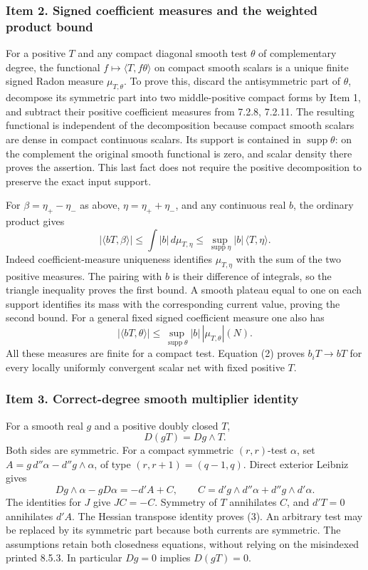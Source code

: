 \documentclass[11pt]{article}
\begin{document}
\subsubsection{Item 2. Signed coefficient measures and the weighted product bound}

For a positive \(T\) and any compact diagonal smooth test \(\theta\) of complementary degree, the functional \(f\mapsto\langle T,f\theta\rangle\) on compact smooth scalars is a unique finite signed Radon measure \(\mu_{T,\theta}\). To prove this, discard the antisymmetric part of \(\theta\), decompose its symmetric part into two middle-positive compact forms by Item 1, and subtract their positive coefficient measures from 7.2.8, 7.2.11. The resulting functional is independent of the decomposition because compact smooth scalars are dense in compact continuous scalars. Its support is contained in \(\operatorname{supp}\theta\): on the complement the original smooth functional is zero, and scalar density there proves the assertion. This last fact does not require the positive decomposition to preserve the exact input support.

For \(\beta=\eta_+-\eta_-\) as above, \(\eta=\eta_++\eta_-\), and any continuous real \(b\), the ordinary product gives
\[
 |\langle bT,\beta\rangle|
 \leq\int |b|\,d\mu_{T,\eta}
 \leq\sup_{\operatorname{supp}\eta}|b|\,\langle T,\eta\rangle.
 \tag{1}
\]
Indeed coefficient-measure uniqueness identifies \(\mu_{T,\eta}\) with the sum of the two positive measures. The pairing with \(b\) is their difference of integrals, so the triangle inequality proves the first bound. A smooth plateau equal to one on each support identifies its mass with the corresponding current value, proving the second bound. For a general fixed signed coefficient measure one also has
\[
 |\langle bT,\theta\rangle|\leq
 \sup_{\operatorname{supp}\theta}|b|\,|\mu_{T,\theta}|(N).
 \tag{2}
\]
All these measures are finite for a compact test. Equation (2) proves \(b_iT\to bT\) for every locally uniformly convergent scalar net with fixed positive \(T\).

\subsubsection{Item 3. Correct-degree smooth multiplier identity}

For a smooth real \(g\) and a positive doubly closed \(T\),
\[
 D(gT)=Dg\wedge T.\tag{3}
\]
Both sides are symmetric. For a compact symmetric \((r,r)\)-test \(\alpha\), set \(A=g\,d''\alpha-d''g\wedge\alpha\), of type \((r,r+1)=(q-1,q)\). Direct exterior Leibniz gives
\[
 Dg\wedge\alpha-gD\alpha
 =-d'A+C,\qquad
 C=d'g\wedge d''\alpha+d''g\wedge d'\alpha.
\]
The identities for \(J\) give \(JC=-C\). Symmetry of \(T\) annihilates \(C\), and \(d'T=0\) annihilates \(d'A\). The Hessian transpose identity proves (3). An arbitrary test may be replaced by its symmetric part because both currents are symmetric. The assumptions retain both closedness equations, without relying on the misindexed printed 8.5.3. In particular \(Dg=0\) implies \(D(gT)=0\).
\end{document}
